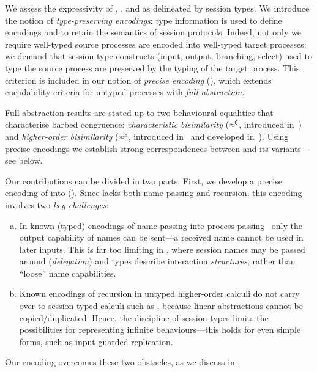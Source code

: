 \documentclass[preprint,11pt]{elsarticle}
\begin{document}
We assess the expressivity  of \HOp, \HO, and \sessp as delineated by session types. 
We introduce the notion of \emph{type-preserving encodings}:
type information is used to define encodings
and to retain the semantics of session protocols. 
Indeed,  not only we require 
well-typed source processes are encoded into 
well-typed target processes: 
we demand that session type constructs (input, output, branching, select) used to type the source process
are preserved by the typing of the target process.
This criterion is included in 
our notion of \emph{precise encoding} (), which 
extends encodability criteria for untyped processes with 
\emph{full abstraction}.
{Full abstraction results are stated
up to two
behavioural equalities that characterise barbed congruence:
\emph{characteristic bisimilarity} ($\approx^\mathtt{C}$, introduced in~\cite{characteristic_bis})
and 
\emph{higher-order bisimilarity} ($\approx^\mathtt{H}$, introduced in~\cite{DBLP:conf/esop/KouzapasPY16} and  developed in~\cite{KouzapasPY17}).
Using precise encodings we establish strong correspondences between 
\HOp and its variants---see 
below.


Our contributions can be divided in two parts. 
First, we develop 
a precise encoding of \HOp into \HO ().  
Since \HO lacks 
both name-passing and recursion, this encoding involves two \emph{key challenges}:
\begin{enumerate}[a.]
\item In known (typed) 
encodings of name-passing into process-passing~\cite{SaWabook} %
only the output capability of names can be sent---a received name cannot be used in later inputs.
This is far too limiting in \HOp, where 
 session names %
 may be passed around (\emph{delegation})
and types describe interaction  \emph{structures}, rather than ``loose'' name capabilities. %



\item %
Known encodings of recursion in untyped higher-order calculi
do not carry over to session typed calculi such as \HOp,
because linear abstractions cannot be copied/duplicated. Hence, the discipline of session types  limits 
the possibilities for representing infinite behaviours---this holds for even simple forms, such as input-guarded replication.
\end{enumerate}
\noindent Our encoding overcomes these two obstacles, as we discuss in .


}
\end{document}

